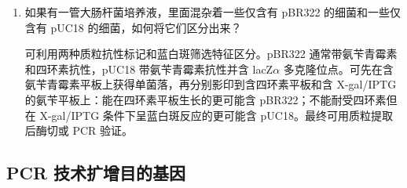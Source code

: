 \documentclass[a4paper]{article}
\begin{document}
\begin{enumerate}[label=\arabic*.]
	\item 如果有一管大肠杆菌培养液，里面混杂着一些仅含有 pBR322 的细菌和一些仅含有 pUC18 的细菌，如何将它们区分出来？

	可利用两种质粒抗性标记和蓝白斑筛选特征区分。pBR322 通常带氨苄青霉素和四环素抗性，pUC18 带氨苄青霉素抗性并含 lacZ$\alpha$ 多克隆位点。可先在含氨苄青霉素平板上获得单菌落，再分别影印到含四环素平板和含 X-gal/IPTG 的氨苄平板上：能在四环素平板生长的更可能含 pBR322；不能耐受四环素但在 X-gal/IPTG 条件下呈蓝白斑反应的更可能含 pUC18。最终可用质粒提取后酶切或 PCR 验证。
\end{enumerate}

\subsection{PCR 技术扩增目的基因}
\end{document}
